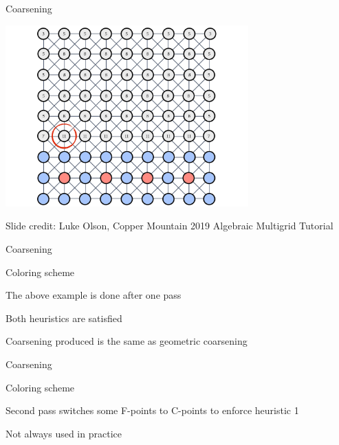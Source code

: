 \documentclass[18pt,xcolor=table]{beamer}
\begin{document}
\begin{frame}{Coarsening}
{\begin{center}
\includegraphics[width=0.7\textwidth]{../figures/amgCoarsening-10}
\end{center}}
\tiny{Slide credit: Luke Olson, Copper Mountain 2019 Algebraic Multigrid Tutorial}
\end{frame}

\begin{frame}{Coarsening}
\begin{block}{Coloring scheme}
\bit
\item The above example is done after one pass
\item Both heuristics are satisfied
\item Coarsening produced is the same as geometric coarsening
\eit
\end{block}
\end{frame}

\begin{frame}{Coarsening}
\begin{block}{Coloring scheme}
\bit
\item Second pass switches some F-points to C-points to enforce heuristic 1
\item Not always used in practice
\eit
\end{block}
\end{frame}
\end{document}
